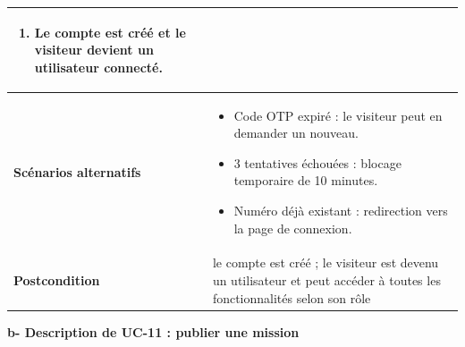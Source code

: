 \begin{table}[H]
\begin{tabular}{|p{3.5cm}|p{10cm}|}
\begin{enumerate}
			\item Le compte est créé et le visiteur devient un utilisateur connecté.
		\end{enumerate} \\
		\hline
		\textbf{Scénarios alternatifs} &
		\begin{itemize}
			\item Code OTP expiré : le visiteur peut en demander un nouveau.
			\item 3 tentatives échouées : blocage temporaire de 10 minutes.
			\item Numéro déjà existant : redirection vers la page de connexion.
		\end{itemize} \\
		\hline
		\textbf{Postcondition} & le compte est créé ; le visiteur est devenu un utilisateur et peut accéder à toutes les fonctionnalités selon son rôle \\
		\hline
	\end{tabular}
\end{table}

\vspace{0.5cm}
\noindent\textbf{\textcolor{vertCongo}{b- Description de UC-11 : publier une mission}}

